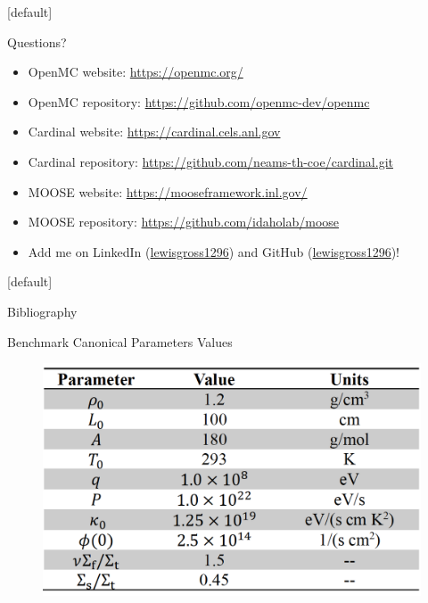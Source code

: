 \documentclass[9pt,t]{beamer}
\makeatletter
\newenvironment{withoutheadline}{
       \setbeamertemplate{headline}[default]
       \def\beamer@entrycode{\vspace*{-\headheight}}
    }{}
\makeatother
\begin{document}
\begin{withoutheadline}
    \begin{frame}{Questions?}
        \begin{itemize}
            \item OpenMC website: \href{https://openmc.org/}{https://openmc.org/}
            \item OpenMC repository: \href{https://github.com/openmc-dev/openmc}{https://github.com/openmc-dev/openmc}
            \item Cardinal website: \href{https://cardinal.cels.anl.gov}{https://cardinal.cels.anl.gov}
            \item Cardinal repository: \href{https://github.com/neams-th-coe/cardinal.git}{https://github.com/neams-th-coe/cardinal.git}
            \item MOOSE website: \href{https://mooseframework.inl.gov/}{https://mooseframework.inl.gov/}
            \item MOOSE repository: \href{https://github.com/idaholab/moose}{https://github.com/idaholab/moose}
            \item Add me on LinkedIn (\href{https://www.linkedin.com/in/lewisgross1296}{lewisgross1296}) and GitHub (\href{https://github.com/lewisgross1296}{lewisgross1296})!
        \end{itemize}
    \end{frame}
\end{withoutheadline}

\begin{withoutheadline}
\begin{frame}[allowframebreaks]{Bibliography}
    \printbibliography
\end{frame}
\end{withoutheadline}

\appendix

\begin{frame}{Benchmark Canonical Parameters Values}
    \begin{figure}[T]
        \centering
        \includegraphics[width=\linewidth]{figures/benchmark_values.png}
    \end{figure}
\end{frame}
\end{document}
